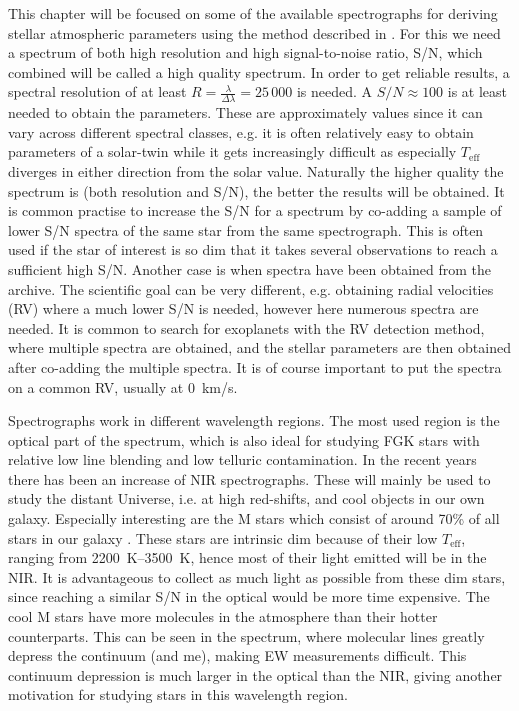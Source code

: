 This chapter will be focused on some of the available spectrographs for deriving stellar atmospheric
parameters using the method described in . For this we need a spectrum of both
high resolution and high signal-to-noise ratio, S/N, which combined will be called a high quality
spectrum. In order to get reliable results, a spectral resolution of at least
$R=\frac{\lambda}{\Delta\lambda}=25\,000$ is needed. A $S/N\approx 100$ is at least needed to obtain
the parameters. These are approximately values since it can vary across different spectral classes,
e.g. it is often relatively easy to obtain parameters of a solar-twin while it gets increasingly
difficult as especially $T_\mathrm{eff}$ diverges in either direction from the solar value.
Naturally the higher quality the spectrum is (both resolution and S/N), the better the results will
be obtained. It is common practise to increase the S/N for a spectrum by co-adding a sample of lower
S/N spectra of the same star from the same spectrograph. This is often used if the star of interest
is so dim that it takes several observations to reach a sufficient high S/N. Another case is when
spectra have been obtained from the archive. The scientific goal can be very different, e.g.
obtaining radial velocities (RV) where a much lower S/N is needed, however here numerous spectra are
needed. It is common to search for exoplanets with the RV detection method, where multiple spectra
are obtained, and the stellar parameters are then obtained after co-adding the multiple spectra. It
is of course important to put the spectra on a common RV, usually at \SI{0}{km/s}.

Spectrographs work in different wavelength regions. The most used region is the optical part of the
spectrum, which is also ideal for studying FGK stars with relative low line blending and low
telluric contamination. In the recent years there has been an increase of NIR spectrographs. These
will mainly be used to study the distant Universe, i.e. at high red-shifts, and cool objects in our
own galaxy. Especially interesting are the M stars which consist of around 70\% of all stars in our
galaxy \citep{Bochanski2010}. These stars are intrinsic dim because of their low $T_\mathrm{eff}$,
ranging from \SIrange{2200}{3500}{K}, hence most of their light emitted will be in the NIR. It is
advantageous to collect as much light as possible from these dim stars, since reaching a similar S/N
in the optical would be more time expensive. The cool M stars have more molecules in the atmosphere
than their hotter counterparts. This can be seen in the spectrum, where molecular lines greatly
depress the continuum (and me), making EW measurements difficult. This
continuum depression is much larger in the optical than the NIR, giving another motivation for
studying stars in this wavelength region.
